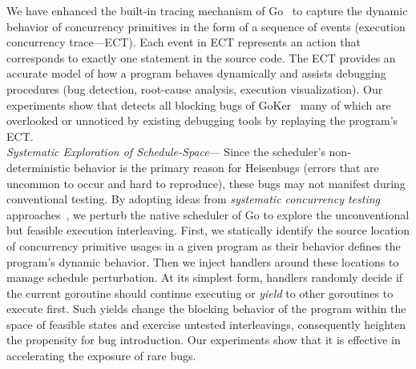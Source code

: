 %
We have enhanced the built-in tracing mechanism of Go~\cite{ect-arxiv} to capture the dynamic behavior of concurrency primitives in the form of a sequence of events (execution concurrency trace---ECT).
%
Each event in ECT represents an action that corresponds to exactly one statement in the source code.
%
The ECT provides an accurate model of how a program behaves dynamically and assists debugging procedures (\eg bug detection, root-cause analysis, execution visualization).
%
Our experiments show that \goat detects all blocking bugs of GoKer~\cite{yuan-gobench-cgo21} many of which are overlooked or unnoticed by existing debugging tools by replaying the program's ECT.
\\
 \textit{Systematic Exploration of Schedule-Space}---
Since the scheduler's non-deterministic behavior is the primary reason for Heisenbugs (\ie errors that are uncommon to occur and hard to reproduce), these bugs may not manifest during conventional testing.
%
By adopting ideas from \textit{systematic concurrency testing} approaches~\cite{dpor,thomson-concurrencyTesting-ppopp14,emmi-delayBounded-popl11,burckhardt-depthBug-asplos10,madanlal-preemptionBound-pldi07,yu-maple-oopsla12,joshi-calfuzzer,contest-jgi01,edelstein2003contest,hong-syncTesting-issta12,christakis-erlang-icst13,yuan-morpheus-asplos20}, we perturb the native scheduler of Go to explore the unconventional but feasible execution interleaving.
%
First, we statically identify the source location of concurrency primitive usages in a given program as their behavior defines the program's dynamic behavior.
%
Then we inject \goat handlers around these locations to manage schedule perturbation.
%
At its simplest form, handlers randomly decide if the current goroutine should continue executing or \textit{yield} to other goroutines to execute first.
%
Such yields change the blocking behavior of the program within the space of feasible states and exercise untested interleavings, consequently heighten the propensity for bug introduction.
%
Our experiments show that it is effective in accelerating the exposure of rare bugs.

